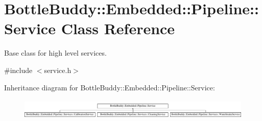 \hypertarget{class_bottle_buddy_1_1_embedded_1_1_pipeline_1_1_service}{}\section{Bottle\+Buddy\+:\+:Embedded\+:\+:Pipeline\+:\+:Service Class Reference}
\label{class_bottle_buddy_1_1_embedded_1_1_pipeline_1_1_service}


Base class for high level services.  




{\ttfamily \#include $<$service.\+h$>$}

Inheritance diagram for Bottle\+Buddy\+:\+:Embedded\+:\+:Pipeline\+:\+:Service\+:\begin{figure}[H]
\begin{center}
\leavevmode
\includegraphics[height=0.995556cm]{class_bottle_buddy_1_1_embedded_1_1_pipeline_1_1_service}
\end{center}
\end{figure}
